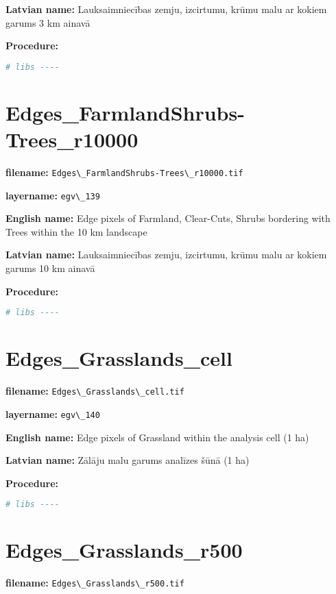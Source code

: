 \documentclass[
]{book}
\newcommand{\passthrough}[1]{#1}
\begin{document}
\textbf{Latvian name:} Lauksaimniecības zemju, izcirtumu, krūmu malu ar kokiem garums 3 km ainavā

\textbf{Procedure:}

\begin{lstlisting}[language=R]
# libs ----
\end{lstlisting}

\section{Edges\_FarmlandShrubs-Trees\_r10000}\label{ch06.139}

\textbf{filename:} \passthrough{\lstinline!Edges\_FarmlandShrubs-Trees\_r10000.tif!}

\textbf{layername:} \passthrough{\lstinline!egv\_139!}

\textbf{English name:} Edge pixels of Farmland, Clear-Cuts, Shrubs bordering with Trees within the 10 km landscape

\textbf{Latvian name:} Lauksaimniecības zemju, izcirtumu, krūmu malu ar kokiem garums 10 km ainavā

\textbf{Procedure:}

\begin{lstlisting}[language=R]
# libs ----
\end{lstlisting}

\section{Edges\_Grasslands\_cell}\label{ch06.140}

\textbf{filename:} \passthrough{\lstinline!Edges\_Grasslands\_cell.tif!}

\textbf{layername:} \passthrough{\lstinline!egv\_140!}

\textbf{English name:} Edge pixels of Grassland within the analysis cell (1 ha)

\textbf{Latvian name:} Zālāju malu garums analīzes šūnā (1 ha)

\textbf{Procedure:}

\begin{lstlisting}[language=R]
# libs ----
\end{lstlisting}

\section{Edges\_Grasslands\_r500}\label{ch06.141}

\textbf{filename:} \passthrough{\lstinline!Edges\_Grasslands\_r500.tif!}
\end{document}
